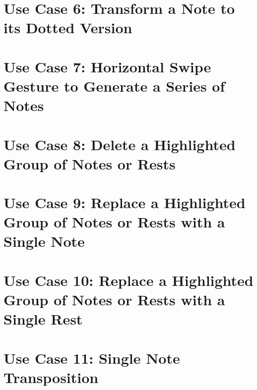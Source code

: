   \section{Use Case 6: Transform a Note to its Dotted Version}


  \section{Use Case 7: Horizontal Swipe Gesture to Generate a Series of Notes}


  \section{Use Case 8: Delete a Highlighted Group of Notes or Rests}


  \section{Use Case 9: Replace a Highlighted Group of Notes or Rests with a Single Note}


  \section{Use Case 10: Replace a Highlighted Group of Notes or Rests with a Single Rest}



  \section{Use Case 11: Single Note Transposition}

